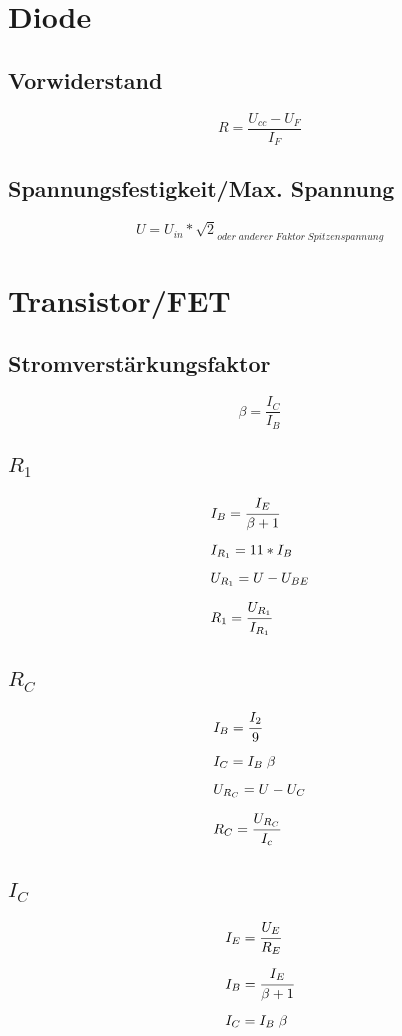 \documentclass[12pt,a5paper,ngerman,titlepage]{article}
\begin{document}
\section{Diode}
\subsection{Vorwiderstand}
$$R=\frac{U_{cc}-U_{F}}{I_{F}}$$
\subsection{Spannungsfestigkeit/Max. Spannung}
$$U=U_{in}*\sqrt{2}_{oder \; anderer \;Faktor \; Spitzenspannung}$$
\newpage
\section{Transistor/FET}

\subsection{Stromverstärkungsfaktor}
$$\beta = \frac{I_{C}}{I_{B}}$$

\subsection{$R_{1}$}
\begin{align*}
& I_{B} = \cfrac{I_{E}}{\beta + 1} \\[5pt]
& I_{R_{1}} = 11 * I_{B}\\[5pt]
& U_{R_{1}} = U - U_{BE}\\[5pt]
& R_{1} = \cfrac{U_{R_{1}}}{I_{R_{1}}}\\[5pt]
\end{align*}

\subsection{$R_{C}$}
\begin{align*}
& I_{B} = \cfrac{I_{2}}{9}\\[5pt]
& I_{C} = I_{B}\; \beta \\[5pt]
& U_{R_{C}}=U-U_{C}\\[5pt]
& R_{C} = \cfrac{U_{R_{C}}}{I_{c}}\\[5pt]
\end{align*}

\subsection{$I_{C}$}
\begin{align*}
& I_{E} = \cfrac{U_{E}}{R_{E}}\\[5pt]
& I_{B} = \cfrac{I_{E}}{\beta + 1}\\[5pt]
& I_{C} = I_{B}\; \beta \\[5pt]
\end{align*}
\end{document}
